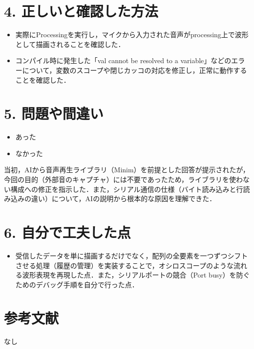 \documentclass[uplatex,dvipdfmx]{jsarticle}
\begin{document}
\section*{4. 正しいと確認した方法} 
\begin{itemize}
    \item 実際にProcessingを実行し，マイクから入力された音声がprocessing上で波形として描画されることを確認した．
    \item コンパイル時に発生した「val cannot be resolved to a variable」などのエラーについて，変数のスコープや閉じカッコの対応を修正し，正常に動作することを確認した．
\end{itemize}

\section*{5. 問題や間違い} 
\begin{itemize}
    \item [\rlap{$\square$}\raisebox{.15ex}{\hspace{0.1em}$\checkmark$}] あった 
    \item [$\square$] なかった 
\end{itemize}
当初，AIから音声再生ライブラリ（Minim）を前提とした回答が提示されたが，今回の目的（外部音のキャプチャ）には不要であったため，ライブラリを使わない構成への修正を指示した．また，シリアル通信の仕様（バイト読み込みと行読み込みの違い）について，AIの説明から根本的な原因を理解できた．

\section*{6. 自分で工夫した点} 
\begin{itemize}
    \item 受信したデータを単に描画するだけでなく，配列の全要素を一つずつシフトさせる処理（履歴の管理）を実装することで，オシロスコープのような流れる波形表現を再現した点．また，シリアルポートの競合（Port busy）を防ぐためのデバッグ手順を自分で行った点．
\end{itemize}

\section*{参考文献} 
なし
\end{document}
